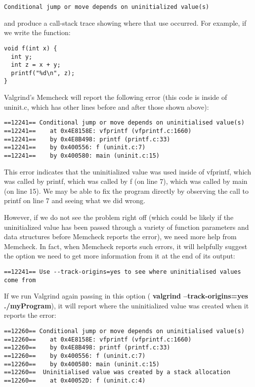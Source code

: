 \documentclass[11pt, a4paper]{article}
\begin{document}
\begin{verbatim}
Conditional jump or move depends on uninitialized value(s)
\end{verbatim}

and produce a call-stack trace showing where that use occurred. For example, if we write the function:

\begin{verbatim}
void f(int x) {
  int y;
  int z = x + y;
  printf("%d\n", z);
}
\end{verbatim}


Valgrind’s Memcheck will report the following error (this code is inside of uninit.c, which has other lines before and after those shown above):



\begin{verbatim}
==12241== Conditional jump or move depends on uninitialised value(s)
==12241==    at 0x4E8158E: vfprintf (vfprintf.c:1660)
==12241==    by 0x4E8B498: printf (printf.c:33)
==12241==    by 0x400556: f (uninit.c:7)
==12241==    by 0x400580: main (uninit.c:15)
\end{verbatim}



This error indicates that the uninitialized value was used inside of vfprintf, which was called by printf, which was called by f (on line 7), which was called by main (on line 15). We may be able to fix the program directly by observing the call to printf on line 7 and seeing what we did wrong.

However, if we do not see the problem right off (which could be likely if the uninitialized value has been passed through a variety of function parameters and data structures before Memcheck reports the error), we need more help from Memcheck. In fact, when Memcheck reports such errors, it will helpfully suggest the option we need to get more information from it at the end of its output:



\begin{verbatim}
==12241== Use --track-origins=yes to see where uninitialised values come from
\end{verbatim}


If we run Valgrind again passing in this option ( \textbf{valgrind --track-origins=yes ./myProgram}), it will report where the uninitialized value was created when it reports the error:

\begin{verbatim}
==12260== Conditional jump or move depends on uninitialised value(s)
==12260==    at 0x4E8158E: vfprintf (vfprintf.c:1660)
==12260==    by 0x4E8B498: printf (printf.c:33)
==12260==    by 0x400556: f (uninit.c:7)
==12260==    by 0x400580: main (uninit.c:15)
==12260==  Uninitialised value was created by a stack allocation
==12260==    at 0x40052D: f (uninit.c:4)
\end{verbatim}
\end{document}
